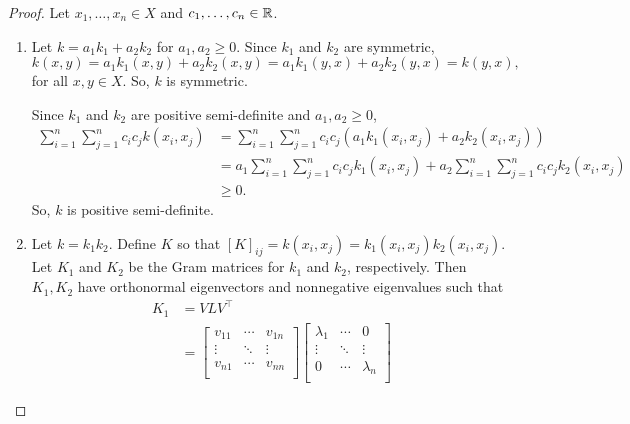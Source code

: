 \begin{proof}
    Let \(x_1, \dots, x_n \in X\) and \(c_1, \dots, c_n \in \mathbb{R}\).
    \begin{enumerate}
        \item \label{itm:kernel-linear-combo}
        Let \(k = a_1k_1 + a_2k_2\) for \(a_1, a_2 \geq 0\).
        Since \(k_1\) and \(k_2\) are symmetric,
        \[
            k(x,y)
            = a_1k_1(x,y) + a_2k_2(x,y)
            = a_1k_1(y,x) + a_2k_2(y,x)
            = k(y,x),
        \]
        for all \(x,y \in X\).
        So, \(k\) is symmetric.

        Since \(k_1\) and \(k_2\) are positive semi-definite and \(a_1, a_2 \geq 0\),
        \begin{align*}
            \sum_{i=1}^{n} \sum_{j=1}^{n} c_i c_j k(x_i,x_j)
            &= \sum_{i=1}^{n} \sum_{j=1}^{n} c_i c_j (a_1 k_1(x_i,x_j) + a_2 k_2(x_i,x_j))\\
            &= a_1 \sum_{i=1}^{n} \sum_{j=1}^{n} c_i c_j k_1(x_i,x_j)
            + a_2 \sum_{i=1}^{n} \sum_{j=1}^{n} c_i c_j k_2(x_i,x_j)\\
            &\geq 0.
        \end{align*}
        So, \(k\) is positive semi-definite.
        \item \label{itm:kernel-product}
        Let \(k = k_1 k_2\).
        Define \(K\) so that \([K]_{ij} = k(x_i,x_j) = k_1(x_i, x_j) k_2(x_i, x_j)\).
        Let \(K_1\) and \(K_2\) be the Gram matrices for \(k_1\) and \(k_2\), respectively.
        Then \(K_1, K_2\) have orthonormal eigenvectors and nonnegative eigenvalues such that
        \def\dsum{\displaystyle\sum}
        \begin{align*}
            K_1 &= V LV^\top \\
            &= \begin{bmatrix}
                v_{11} & \cdots & v_{1n}\\
                \vdots & \ddots & \vdots\\
                v_{n1} & \cdots & v_{nn}\\
            \end{bmatrix}
            \begin{bmatrix}
                \lambda_{1} & \cdots & 0\\
                \vdots & \ddots & \vdots\\
                0 & \cdots & \lambda_{n}\\
            \end{bmatrix}

\end{align*}
\end{enumerate}
\end{proof}
